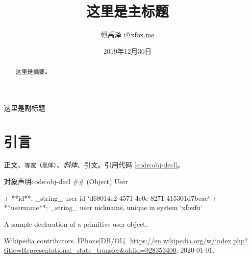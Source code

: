 \documentclass[a4paper, 12pt]{article} %
\title{\textbf{这里是主标题}\\ %
} %
\author{
傅禹泽 \href{mailto:i@xfox.me}{i@xfox.me}} %
\date{2019年12月30日} %
\makeatletter
\newcounter{code}
\renewcommand{\maketitle}{ %
\begin{center} %
{\LARGE\@title} %

\large{\@subtitle}

\vspace{1em} %

{\large\@author} %

\vspace{1.5em} %
\end{center}
}
\newcommand\@subtitle{这里是副标题}
\makeatother
\begin{document}
\thispagestyle{empty}
\maketitle %


\renewcommand{\abstractname}{摘要} %

\begin{abstract}
    这里是摘要。
\end{abstract}


\section{引言}

正文、\texttt{等宽（黑体）}、\textit{斜体}、引文\cite{wiki-iphone}。引用代码 \ref{code:obj-decl}。

\begin{code}{对象声明}{code:obj-decl}
  ## (Object) User

  + **id**: _string_ user id `d68014e2-4571-4e0e-8271-415301d7bcae`
  + **username**: _string_ user nickname, unique in system `xfoxfu`
  
  A sample declaration of a primitive user object.
\end{code}

\begin{thebibliography}{99}


    Wikipedia contributors.
    IPhone[DB/OL].
    \url{https://en.wikipedia.org/w/index.php?title=Representational_state_transfer&oldid=928353400}, 2020-01-01.
\end{thebibliography}


\end{document}
